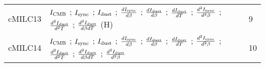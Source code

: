 \begin{tabular}{cll}
 cMILC13 &  $I_{\rm CMB}$ ; $I_{\rm sync}$ ; $I_{\rm dust}$ ; $\frac{d I_{\rm sync}}{d \beta}$ ; $\frac{d I_{\rm dust}}{d \beta}$ ; $\frac{d I_{\rm dust}}{d T}$ ; $\frac{d^2 I_{\rm sync}}{d^2 \beta}$ ; $\frac{d^2 I_{\rm dust}}{d^2 T}$ ; $\frac{d^2 I_{\rm dust}}{d \beta d T}$ (H) &  9 \\
 cMILC14 &  $I_{\rm CMB}$ ; $I_{\rm sync}$ ; $I_{\rm dust}$ ; $\frac{d I_{\rm sync}}{d \beta}$ ; $\frac{d I_{\rm dust}}{d \beta}$ ; $\frac{d I_{\rm dust}}{d T}$ ; $\frac{d^2 I_{\rm sync}}{d^2 \beta}$ ; $\frac{d^2 I_{\rm dust}}{d^2 T}$ ; $\frac{d^2 I_{\rm dust}}{d \beta d T}$ ; $\frac{d^2 I_{\rm dust}}{d^2 \beta}$ &  10 \\
\bottomrule
\end{tabular}
